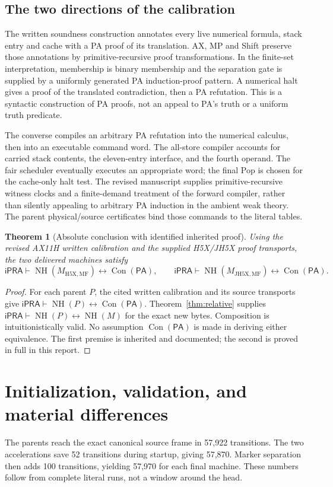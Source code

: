 \documentclass[11pt,letterpaper]{article}
\newcommand{\ipra}{\mathsf{iPRA}}
\newcommand{\PA}{\mathsf{PA}}
\newcommand{\Con}{\operatorname{Con}}
\newcommand{\NH}{\operatorname{NH}}
\newcommand{\Mone}{\ensuremath{M_{\mathrm{H5X,MF}}}}
\newcommand{\Mtwo}{\ensuremath{M_{\mathrm{JH5X,MF}}}}
\newtheorem{theorem}{Theorem}[section]
\begin{document}
\subsection{The two directions of the calibration}
The written soundness construction annotates every live numerical formula,
stack entry and cache with a PA proof of its translation. AX, MP and Shift
preserve those annotations by primitive-recursive proof transformations.
In the finite-set interpretation, membership is binary membership and the
separation gate is supplied by a uniformly generated PA induction-proof
pattern. A numerical halt gives a proof of the translated contradiction,
then a PA refutation. This is a syntactic construction of PA proofs, not
an appeal to PA's truth or a uniform truth predicate.

The converse compiles an arbitrary PA refutation into the numerical calculus,
then into an executable command word. The all-store compiler accounts for
carried stack contents, the eleven-entry interface, and the fourth operand.
The fair scheduler eventually executes an appropriate word; the final Pop
is chosen for the cache-only halt test. The revised manuscript supplies
primitive-recursive witness clocks and a finite-demand treatment of the
forward compiler, rather than silently appealing to arbitrary PA induction
in the ambient weak theory. The parent physical/source certificates bind
those commands to the literal tables.

\begin{theorem}[Absolute conclusion with identified inherited proof]
Using the revised AX11H written calibration and the supplied H5X/JH5X
proof transports, the two delivered machines satisfy
\[
 \ipra\vdash\NH(\Mone)\leftrightarrow\Con(\PA),\qquad
 \ipra\vdash\NH(\Mtwo)\leftrightarrow\Con(\PA).
\]
\end{theorem}
\begin{proof}
For each parent $P$, the cited written calibration and its source transports
give $\ipra\vdash\NH(P)\leftrightarrow\Con(\PA)$.
Theorem~\ref{thm:relative} supplies
$\ipra\vdash\NH(P)\leftrightarrow\NH(M)$ for the exact new bytes.
Composition is intuitionistically valid. No assumption $\Con(\PA)$ is
made in deriving either equivalence. The first premise is inherited and
documented; the second is proved in full in this report.
\end{proof}

\section{Initialization, validation, and material differences}
\label{sec:validation}
The parents reach the exact canonical source frame in 57,922 transitions.
The two accelerations save 52 transitions during startup, giving 57,870.
Marker separation then adds 100 transitions, yielding 57,970 for each
final machine. These numbers follow from complete literal runs, not a
window around the head.
\end{document}
